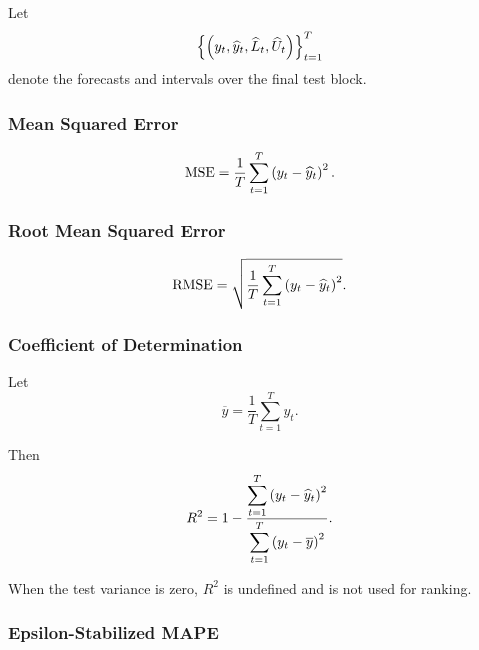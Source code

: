 \documentclass[review,number,sort&compress]{elsarticle}
\begin{document}
Let
\begin{equation}
    \left\{
    \left(
    y_t,
    \widehat{y}_t,
    \widehat{L}_t,
    \widehat{U}_t
    \right)
    \right\}_{t=1}^{T}
\end{equation}
denote the forecasts and intervals over the final test block.

\subsubsection{Mean Squared Error}

\begin{equation}
    \mathrm{MSE}
    =
    \frac{1}{T}
    \sum_{t=1}^{T}
    \left(
    y_t-\widehat{y}_t
    \right)^2.
    \label{eq:mse}
\end{equation}

\subsubsection{Root Mean Squared Error}

\begin{equation}
    \mathrm{RMSE}
    =
    \sqrt{
    \frac{1}{T}
    \sum_{t=1}^{T}
    \left(
    y_t-\widehat{y}_t
    \right)^2
    }.
    \label{eq:rmse}
\end{equation}

\subsubsection{Coefficient of Determination}

Let
\begin{equation}
    \overline{y}
    =
    \frac{1}{T}
    \sum_{t=1}^{T}y_t.
\end{equation}

Then
\begin{equation}
    R^2
    =
    1
    -
    \frac{
        \displaystyle
        \sum_{t=1}^{T}
        \left(
        y_t-\widehat{y}_t
        \right)^2
    }{
        \displaystyle
        \sum_{t=1}^{T}
        \left(
        y_t-\overline{y}
        \right)^2
    }.
    \label{eq:r2}
\end{equation}

When the test variance is zero, $R^2$ is undefined and is not used for ranking.

\subsubsection{Epsilon-Stabilized MAPE}
\end{document}
